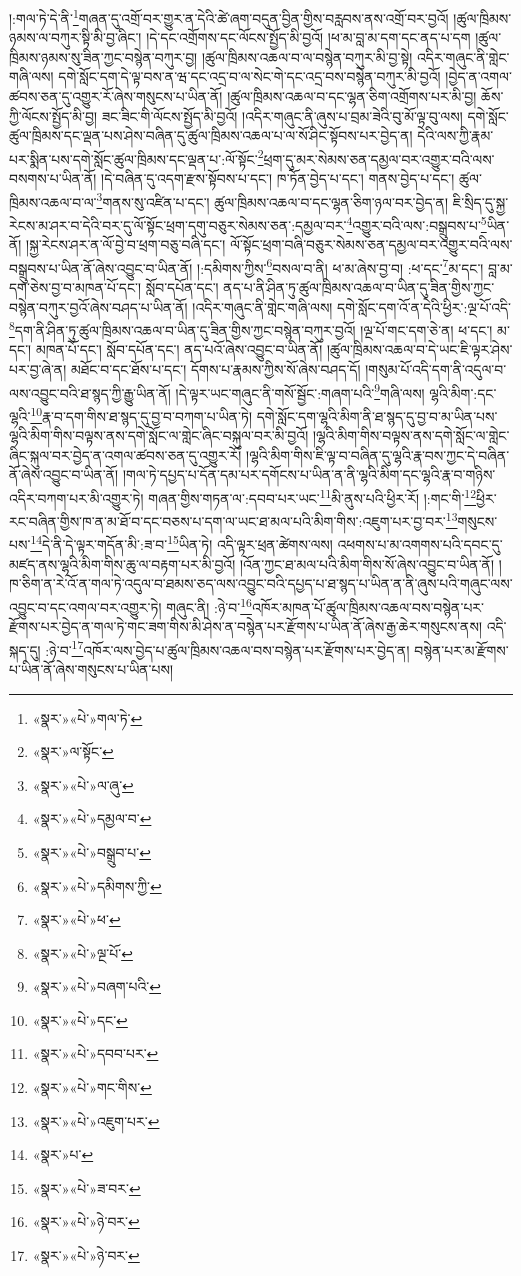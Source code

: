 །:གལ་ཏེ་དེ་ནི་\footnote{«སྣར་»«པེ་»གལ་ཏེ་}གཞན་དུ་འགྲོ་བར་གྱུར་ན་དེའི་ཚེ་ཞག་བདུན་བྱིན་གྱིས་བརླབས་ནས་འགྲོ་བར་བྱའོ། །ཚུལ་ཁྲིམས་ཉམས་ལ་བཀུར་སྟི་མི་བྱ་ཞིང་། །དེ་དང་འགྲོགས་དང་ལོངས་སྤྱོད་མི་བྱའོ། །ཕ་མ་བླ་མ་དག་དང་ནད་པ་དག །ཚུལ་ཁྲིམས་ཉམས་སུ་ཟིན་ཀྱང་བསྙེན་བཀུར་བྱ། །ཚུལ་ཁྲིམས་འཆལ་བ་ལ་བསྙེན་བཀུར་མི་བྱ་སྟེ། འདིར་གཞུང་ནི་གླེང་གཞི་ལས། དགེ་སློང་དག་དེ་ལྟ་བས་ན་ཝ་དང་འདྲ་བ་ལ་སེང་གེ་དང་འདྲ་བས་བསྙེན་བཀུར་མི་བྱའོ། །བྱེད་ན་འགལ་ཚབས་ཅན་དུ་འགྱུར་རོ་ཞེས་གསུངས་པ་ཡིན་ནོ། །ཚུལ་ཁྲིམས་འཆལ་བ་དང་ལྷན་ཅིག་འགྲོགས་པར་མི་བྱ། ཆོས་ཀྱི་ལོངས་སྤྱོད་མི་བྱ། ཟང་ཟིང་གི་ལོངས་སྤྱོད་མི་བྱའོ། །འདིར་གཞུང་ནི་ཞུས་པ་བྲམ་ཟེའི་བུ་མོ་ལྟ་བུ་ལས། དགེ་སློང་ཚུལ་ཁྲིམས་དང་ལྡན་པས་ཤེས་བཞིན་དུ་ཚུལ་ཁྲིམས་འཆལ་པ་ལ་སོ་ཤིང་སྟོབས་པར་བྱེད་ན། དེའི་ལས་ཀྱི་རྣམ་པར་སྨིན་པས་དགེ་སློང་ཚུལ་ཁྲིམས་དང་ལྡན་པ་:ལོ་སྟོང་\footnote{«སྣར་»ལ་སྟོང་}ཕྲག་དུ་མར་སེམས་ཅན་དམྱལ་བར་འགྱུར་བའི་ལས་བསགས་པ་ཡིན་ནོ། །དེ་བཞིན་དུ་འདག་རྫས་སྟོབས་པ་དང་། ཁ་ཏོན་བྱེད་པ་དང་། གནས་བྱེད་པ་དང་། ཚུལ་ཁྲིམས་འཆལ་བ་ལ་\footnote{«སྣར་»«པེ་»ལ་ཞུ་}གནས་སུ་འཛིན་པ་དང་། ཚུལ་ཁྲིམས་འཆལ་བ་དང་ལྷན་ཅིག་ཉལ་བར་བྱེད་ན། ཇི་སྲིད་དུ་སྐྱ་རེངས་མ་ཤར་བ་དེའི་བར་དུ་ལོ་སྟོང་ཕྲག་དགུ་བཅུར་སེམས་ཅན་:དམྱལ་བར་\footnote{«སྣར་»«པེ་»དམྱལ་བ་}འགྱུར་བའི་ལས་:བསྒྲུབས་པ་\footnote{«སྣར་»«པེ་»བསྒྲུབ་པ་}ཡིན་ནོ། །སྐྱ་རེངས་ཤར་ན་ལོ་བྱེ་བ་ཕྲག་བཅུ་བཞི་དང་། ལོ་སྟོང་ཕྲག་བཞི་བཅུར་སེམས་ཅན་དམྱལ་བར་འགྱུར་བའི་ལས་བསྒྲུབས་པ་ཡིན་ནོ་ཞེས་འབྱུང་བ་ཡིན་ནོ། །:དམིགས་ཀྱིས་\footnote{«སྣར་»«པེ་»དམིགས་ཀྱི་}བསལ་བ་ནི། ཕ་མ་ཞེས་བྱ་བ། :ཕ་དང་\footnote{«སྣར་»«པེ་»ཕ་}མ་དང་། བླ་མ་དག་ཅེས་བྱ་བ་མཁན་པོ་དང་། སློབ་དཔོན་དང་། ནད་པ་ནི་ཤིན་ཏུ་ཚུལ་ཁྲིམས་འཆལ་བ་ཡིན་དུ་ཟིན་གྱིས་ཀྱང་བསྙེན་བཀུར་བྱའོ་ཞེས་བཤད་པ་ཡིན་ནོ། །འདིར་གཞུང་ནི་གླེང་གཞི་ལས། དགེ་སློང་དག་འོ་ན་དེའི་ཕྱིར་:ལྔ་པོ་འདི་\footnote{«སྣར་»«པེ་»ལྔ་པོ་}དག་ནི་ཤིན་ཏུ་ཚུལ་ཁྲིམས་འཆལ་བ་ཡིན་དུ་ཟིན་གྱིས་ཀྱང་བསྙེན་བཀུར་བྱའོ། །ལྔ་པོ་གང་དག་ཅེ་ན། ཕ་དང་། མ་དང་། མཁན་པོ་དང་། སློབ་དཔོན་དང་། ནད་པའོ་ཞེས་འབྱུང་བ་ཡིན་ནོ། །ཚུལ་ཁྲིམས་འཆལ་བ་དེ་ཡང་ཇི་ལྟར་ཤེས་པར་བྱ་ཞེ་ན། མཐོང་བ་དང་ཐོས་པ་དང་། དོགས་པ་རྣམས་ཀྱིས་སོ་ཞེས་བཤད་དོ། །གསུམ་པོ་འདི་དག་ནི་འདུལ་བ་ལས་འབྱུང་བའི་ཐ་སྙད་ཀྱི་རྒྱུ་ཡིན་ནོ། །དེ་ལྟར་ཡང་གཞུང་ནི་གསོ་སྦྱོང་:གཞག་པའི་\footnote{«སྣར་»«པེ་»བཞག་པའི་}གཞི་ལས། ལྷའི་མིག་:དང་ལྷའི་\footnote{«སྣར་»«པེ་»དང་}རྣ་བ་དག་གིས་ཐ་སྙད་དུ་བྱ་བ་བཀག་པ་ཡིན་ཏེ། དགེ་སློང་དག་ལྷའི་མིག་ནི་ཐ་སྙད་དུ་བྱ་བ་མ་ཡིན་པས་ལྷའི་མིག་གིས་བལྟས་ནས་དགེ་སློང་ལ་གླེང་ཞིང་བསྐུལ་བར་མི་བྱའོ། །ལྷའི་མིག་གིས་བལྟས་ནས་དགེ་སློང་ལ་གླེང་ཞིང་སྐུལ་བར་བྱེད་ན་འགལ་ཚབས་ཅན་དུ་འགྱུར་རོ། །ལྷའི་མིག་གིས་ཇི་ལྟ་བ་བཞིན་དུ་ལྷའི་རྣ་བས་ཀྱང་དེ་བཞིན་ནོ་ཞེས་འབྱུང་བ་ཡིན་ནོ། །གལ་ཏེ་དཔྱད་པ་དོན་དམ་པར་དགོངས་པ་ཡིན་ན་ནི་ལྷའི་མིག་དང་ལྷའི་རྣ་བ་གཉིས་འདིར་བཀག་པར་མི་འགྱུར་ཏེ། གཞན་གྱིས་གཏན་ལ་:དབབ་པར་ཡང་\footnote{«སྣར་»«པེ་»དབབ་པར་}མི་ནུས་པའི་ཕྱིར་རོ། །:གང་གི་\footnote{«སྣར་»«པེ་»གང་གིས་}ཕྱིར་རང་བཞིན་གྱིས་ཁ་ན་མ་ཐོ་བ་དང་བཅས་པ་དག་ལ་ཡང་ཐ་མལ་པའི་མིག་གིས་:འཇུག་པར་བྱ་བར་\footnote{«སྣར་»«པེ་»འཇུག་པར་}གསུངས་པས་\footnote{«སྣར་»པ་}དེ་ནི་དེ་ལྟར་གདོན་མི་:ཟ་བ་\footnote{«སྣར་»«པེ་»ཟ་བར་}ཡིན་ཏེ། འདི་ལྟར་ཕྲན་ཚེགས་ལས། འཕགས་པ་མ་འགགས་པའི་དབང་དུ་མཛད་ནས་ལྷའི་མིག་གིས་ཆུ་ལ་བརྟག་པར་མི་བྱའོ། །འོན་ཀྱང་ཐ་མལ་པའི་མིག་གིས་སོ་ཞེས་འབྱུང་བ་ཡིན་ནོ། །ཁ་ཅིག་ན་རེ་འོ་ན་གལ་ཏེ་འདུལ་བ་ཐམས་ཅད་ལས་འབྱུང་བའི་དཔྱད་པ་ཐ་སྙད་པ་ཡིན་ན་ནི་ཞུས་པའི་གཞུང་ལས་འབྱུང་བ་དང་འགལ་བར་འགྱུར་ཏེ། གཞུང་ནི། :ཉེ་བ་\footnote{«སྣར་»«པེ་»ཉེ་བར་}འཁོར་མཁན་པོ་ཚུལ་ཁྲིམས་འཆལ་བས་བསྙེན་པར་རྫོགས་པར་བྱེད་ན་གལ་ཏེ་གང་ཟག་གིས་མི་ཤེས་ན་བསྙེན་པར་རྫོགས་པ་ཡིན་ནོ་ཞེས་རྒྱ་ཆེར་གསུངས་ནས། འདི་སྐད་དུ། :ཉེ་བ་\footnote{«སྣར་»«པེ་»ཉེ་བར་}འཁོར་ལས་བྱེད་པ་ཚུལ་ཁྲིམས་འཆལ་བས་བསྙེན་པར་རྫོགས་པར་བྱེད་ན། བསྙེན་པར་མ་རྫོགས་པ་ཡིན་ནོ་ཞེས་གསུངས་པ་ཡིན་པས། 